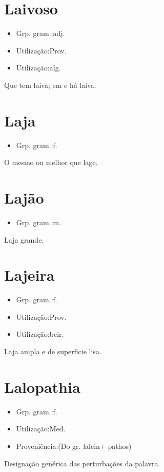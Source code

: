 \section{Laivoso}
\begin{itemize}
\item {Grp. gram.:adj.}
\end{itemize}
\begin{itemize}
\item {Utilização:Prov.}
\end{itemize}
\begin{itemize}
\item {Utilização:alg.}
\end{itemize}
Que tem laiva; em e há laiva.
\section{Laja}
\begin{itemize}
\item {Grp. gram.:f.}
\end{itemize}
O mesmo ou melhor que \textunderscore lage\textunderscore .
\section{Lajão}
\begin{itemize}
\item {Grp. gram.:m.}
\end{itemize}
Laja grande.
\section{Lajeira}
\begin{itemize}
\item {Grp. gram.:f.}
\end{itemize}
\begin{itemize}
\item {Utilização:Prov.}
\end{itemize}
\begin{itemize}
\item {Utilização:beir.}
\end{itemize}
Laja ampla e de superficie lisa.
\section{Lalopathia}
\begin{itemize}
\item {Grp. gram.:f.}
\end{itemize}
\begin{itemize}
\item {Utilização:Med.}
\end{itemize}
\begin{itemize}
\item {Proveniência:(Do gr. \textunderscore lalein\textunderscore  + \textunderscore pathos\textunderscore )}
\end{itemize}
Designação genérica das perturbações da palavra.

